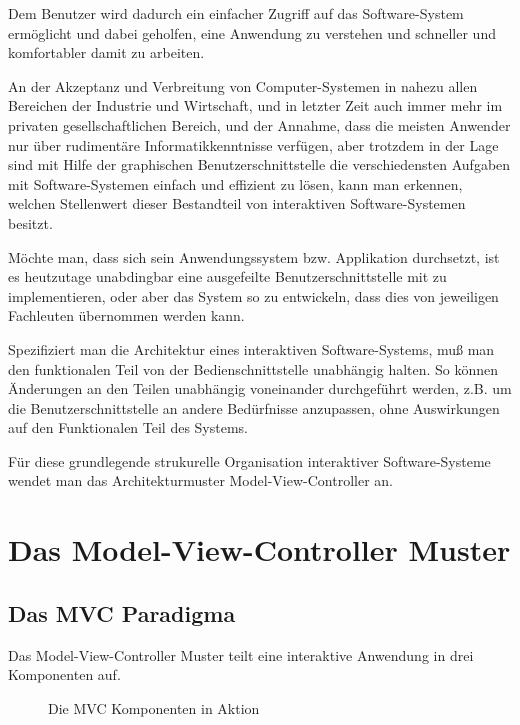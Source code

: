 \documentclass[11pt,a4paper,titlepage]{scrreprt}
\begin{document}
Dem Benutzer wird dadurch ein einfacher Zugriff auf das Software-System ermöglicht und
dabei geholfen, eine Anwendung zu verstehen und schneller und komfortabler damit zu arbeiten.

An der Akzeptanz und Verbreitung von Computer-Systemen in nahezu allen Bereichen der Industrie
und Wirtschaft, und in letzter Zeit auch immer mehr im privaten gesellschaftlichen Bereich, und
der Annahme, dass die meisten Anwender nur über rudimentäre
Informatikkenntnisse verfügen, aber trotzdem in der Lage sind mit Hilfe der graphischen
Benutzerschnittstelle die verschiedensten Aufgaben mit Software-Systemen einfach und effizient
zu lösen, kann man erkennen, welchen Stellenwert dieser Bestandteil von interaktiven
Software-Systemen besitzt.

Möchte man, dass sich sein Anwendungssystem bzw. Applikation durchsetzt, ist es heutzutage
unabdingbar eine ausgefeilte Benutzerschnittstelle mit zu implementieren, oder aber 
das System so zu entwickeln, dass dies von jeweiligen Fachleuten übernommen werden kann.

Spezifiziert man die Architektur eines interaktiven Software-Systems, muß man den funktionalen
Teil von der Bedienschnittstelle unabhängig halten. So können Änderungen an den Teilen
unabhängig voneinander durchgeführt werden, z.B. um die Benutzerschnittstelle an andere
Bedürfnisse anzupassen, ohne Auswirkungen auf den Funktionalen Teil des Systems.

Für diese grundlegende strukurelle Organisation interaktiver Software-Systeme wendet man
das Architekturmuster Model-View-Controller an.

\chapter{Das Model-View-Controller Muster}
\section{Das MVC Paradigma}
Das Model-View-Controller Muster teilt eine interaktive Anwendung in drei Komponenten auf.

\begin{figure}[h]
\caption{Die MVC Komponenten in Aktion}
\end{figure}
\end{document}
